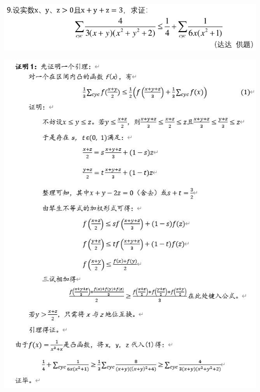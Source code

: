 \documentclass[UTF8]{ctexart}
\begin{document}
\subsection{}
\begin{center}
	\includegraphics[width=0.5\linewidth]{a25}
\end{center}
\begin{center}
	\includegraphics[width=0.8\linewidth]{a26}
\end{center}
\end{document}
